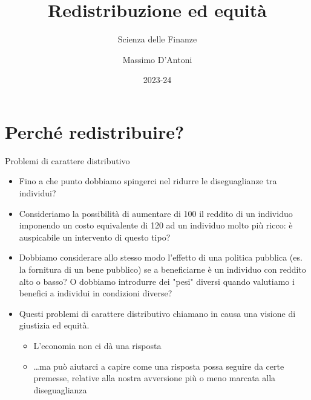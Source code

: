 \documentclass[aspectratio=64,11pt]{beamer}
\institute{Università di Siena}
\author{Massimo D'Antoni}
\date{2023-24}
\title{Redistribuzione ed equità}
\subtitle{Scienza delle Finanze}
\begin{document}
\maketitle

\section{Perché redistribuire?}


\begin{frame}{Problemi di carattere distributivo}
\begin{itemize}
\item Fino a che punto dobbiamo spingerci nel ridurre le diseguaglianze tra
individui?
\item Consideriamo la possibilità di aumentare di 100 il reddito di un individuo
imponendo un costo equivalente di 120 ad un individuo molto più ricco: è
auspicabile un intervento di questo tipo?
\item Dobbiamo considerare allo stesso modo l'effetto di una politica pubblica
(es. la fornitura di un bene pubblico) se a beneficiarne è un individuo con
reddito alto o basso? O dobbiamo introdurre dei "pesi" diversi quando
valutiamo i benefici a individui in condizioni diverse?
\item Questi problemi di carattere \alert{distributivo} chiamano in causa una visione di
giustizia ed equità.
\begin{itemize}
\item L'economia non ci dà una risposta
\item \ldots{}ma può aiutarci a capire come una risposta possa seguire da certe
premesse, relative alla nostra avversione più o meno marcata alla
diseguaglianza
\end{itemize}
\end{itemize}
\end{frame}
\end{document}
